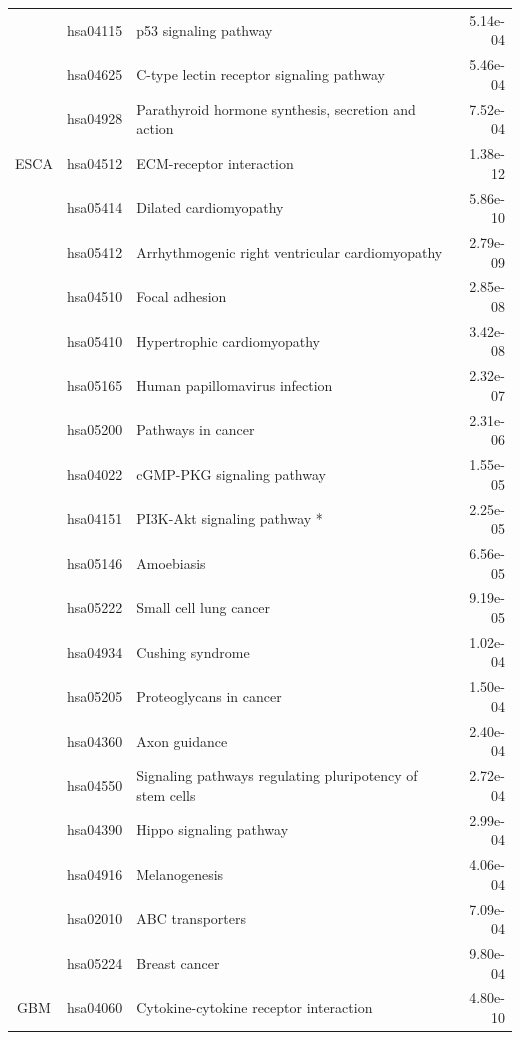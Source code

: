 \begin{longtable}{cllr}
 & hsa04115 & \textcolor{\clrnew}{p53 signaling pathway} & 5.14e-04 \\ 
 & hsa04625 & \textcolor{\clrnew}{C-type lectin receptor signaling pathway} & 5.46e-04 \\ 
 & hsa04928 & \textcolor{\clrnew}{Parathyroid hormone synthesis, secretion and action} & 7.52e-04 \\ 
\midrule 
\rowcolor{\clrmatch}ESCA & hsa04512 & ECM-receptor interaction & 1.38e-12\\ 
 & hsa05414 & \textcolor{\clrnew}{Dilated cardiomyopathy} & 5.86e-10 \\ 
 \rowcolor{\clrmatch}& hsa05412 & Arrhythmogenic right ventricular cardiomyopathy & 2.79e-09 \\ 
 \rowcolor{\clrmatch}& hsa04510 & Focal adhesion & 2.85e-08 \\ 
 & hsa05410 & \textcolor{\clrnew}{Hypertrophic cardiomyopathy} & 3.42e-08 \\ 
 & hsa05165 & \textcolor{\clrnew}{Human papillomavirus infection} & 2.32e-07 \\ 
 & hsa05200 & \textcolor{\clrnew}{Pathways in cancer} & 2.31e-06 \\ 
 & hsa04022 & \textcolor{\clrnew}{cGMP-PKG signaling pathway} & 1.55e-05 \\ 
 & hsa04151 & \textcolor{\clrnew}{PI3K-Akt signaling pathway *} & 2.25e-05 \\ 
 & hsa05146 & \textcolor{\clrnew}{Amoebiasis} & 6.56e-05 \\ 
 & hsa05222 & \textcolor{\clrnew}{Small cell lung cancer} & 9.19e-05 \\ 
 & hsa04934 & \textcolor{\clrnew}{Cushing syndrome} & 1.02e-04 \\ 
 & hsa05205 & \textcolor{\clrnew}{Proteoglycans in cancer} & 1.50e-04 \\ 
 & hsa04360 & \textcolor{\clrnew}{Axon guidance} & 2.40e-04 \\ 
 & hsa04550 & \textcolor{\clrnew}{Signaling pathways regulating pluripotency of stem cells} & 2.72e-04 \\ 
 & hsa04390 & \textcolor{\clrnew}{Hippo signaling pathway} & 2.99e-04 \\ 
 & hsa04916 & \textcolor{\clrnew}{Melanogenesis} & 4.06e-04 \\ 
 & hsa02010 & \textcolor{\clrnew}{ABC transporters} & 7.09e-04 \\ 
 & hsa05224 & \textcolor{\clrnew}{Breast cancer} & 9.80e-04 \\ 
\midrule 
GBM & hsa04060 & \textcolor{\clrnew}{Cytokine-cytokine receptor interaction} & 4.80e-10\\ 

\end{longtable}
